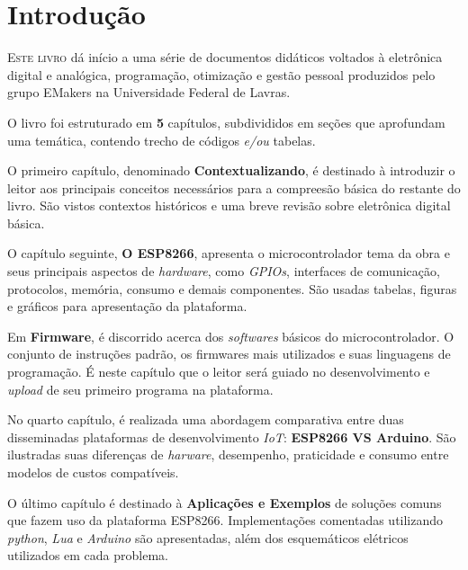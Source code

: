 \documentclass[
	11pt,				%
	openright,			%
	twoside,			%
	a5paper,			%
	english,			%
	french,				%
	spanish,			%
	brazil,				%
	sumario=tradicional
]{abntex2}
\begin{document}
\chapter*[Introdução]{Introdução}

\lettrine[nindent=0.35em,lhang=0.40,loversize=0.3]{E}{ste livro} dá início a uma
série de documentos didáticos voltados à eletrônica digital e analógica, programação, otimização e gestão pessoal produzidos pelo grupo EMakers na Universidade Federal de Lavras. 

O livro foi estruturado em \textsf{\textbf{5}} capítulos, subdivididos em seções que aprofundam uma temática, contendo trecho de códigos \emph{e/ou} tabelas.

O primeiro capítulo, denominado \textsf{\textbf{Contextualizando}}, é destinado à introduzir o leitor aos principais conceitos necessários para a compreesão básica do restante do livro. São vistos contextos históricos e uma breve revisão sobre eletrônica digital básica.

O capítulo seguinte, \textsf{\textbf{O ESP8266}}, apresenta o microcontrolador tema da obra e seus principais aspectos de \textit{hardware}, como \textit{GPIOs}, interfaces de comunicação, protocolos, memória, consumo e demais componentes. São usadas tabelas, figuras e gráficos para apresentação da plataforma.

Em  \textsf{\textbf{Firmware}}, é discorrido acerca dos \textit{softwares} básicos do microcontrolador. O conjunto de instruções padrão, os firmwares mais utilizados e suas linguagens de programação. É neste capítulo que o leitor será guiado no desenvolvimento e \textit{upload} de seu primeiro programa na plataforma. 

No quarto capítulo, é realizada uma abordagem comparativa entre duas disseminadas plataformas de desenvolvimento \textit{IoT}: \textsf{\textbf{ESP8266 {\footnotesize{VS}} Arduino}}. São ilustradas suas diferenças de \textit{harware}, desempenho, praticidade e consumo entre modelos de custos compatíveis. 

O último capítulo é destinado à \textsf{\textbf{Aplicações e Exemplos}} de soluções comuns que fazem uso da plataforma ESP8266. Implementações comentadas utilizando \textit{python}, \textit{Lua} e \textit{Arduino} são apresentadas, além dos esquemáticos elétricos utilizados em cada problema.
\end{document}

